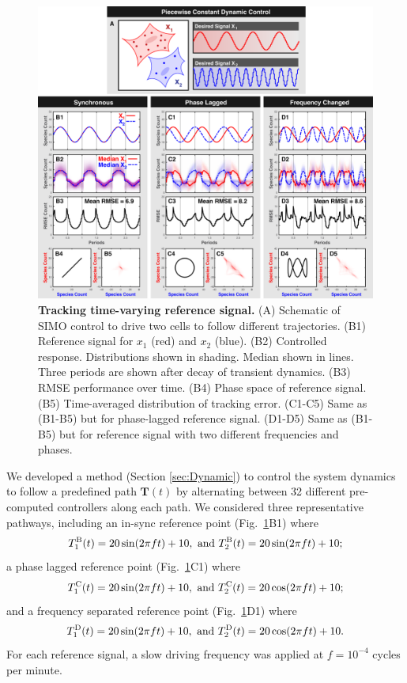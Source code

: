 \documentclass[12pt]{iopart}
\begin{document}
\begin{figure}
\begin{center}
\includegraphics[width=1\textwidth]{DynamicControl.pdf}
\vspace{-0.1in}
\caption{{\bf Tracking time-varying reference signal.}
(A) Schematic of SIMO control to drive two cells to follow different trajectories.
(B1) Reference signal for $x_1$ (red) and $x_2$ (blue).
(B2) Controlled response. Distributions shown in shading. Median shown in lines. Three periods are shown after decay of transient dynamics.
(B3) RMSE performance over time.
(B4) Phase space of reference signal.
(B5) Time-averaged distribution of tracking error.
(C1-C5) Same as (B1-B5) but for phase-lagged reference signal.
(D1-D5) Same as (B1-B5) but for reference signal with two different frequencies and phases.}
\label{CR}
\end{center}
\vspace{-0.2in}
\end{figure}

We developed a method (Section \ref{sec:Dynamic}) to control the system dynamics to follow a predefined path $\mathbf{T}(t)$ by alternating between 32 different pre-computed controllers along each path. We considered three representative pathways, including an in-sync reference point (Fig.\ \ref{CR}B1) where 
$$
T^{\rm B}_1(t) =20 \sin(2 \pi f t)+10,\textrm{ and } T^{\rm B}_2(t) = 20 \sin(2 \pi f t)+10;
$$
a phase lagged reference point (Fig.\ \ref{CR}C1) where
$$
T^{\rm C}_1(t)=20 \sin(2 \pi f t)+10,\textrm{ and } T^{\rm C}_2(t) =20 \cos(2 \pi f t)+10;
$$
and a frequency separated reference point (Fig.\ \ref{CR}D1) where
$$
T^{\rm D}_1(t)=20 \sin(2 \pi f t)+10,\textrm{ and } T^{\rm D}_2(t) =20 \cos(2 \pi f t)+10.
$$
For each reference signal, a slow driving frequency was applied at $f=10^{-4}$ cycles per minute.
\end{document}
